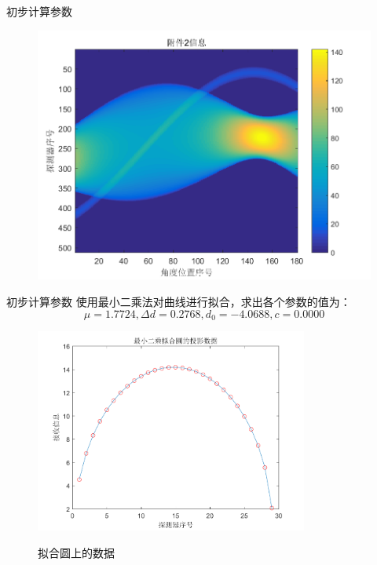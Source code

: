 \documentclass[serif]{beamer} %
\begin{document}
\begin{frame}{初步计算参数}
\begin{figure}[H]
\begin{minipage}[H]{0.45\textwidth}
		\includegraphics[width=\textwidth]{./pic/fujian2.png}
		\end{minipage}
	\end{figure}

\end{frame}

\begin{frame}{初步计算参数}
	\small 使用最小二乘法对曲线进行拟合，求出各个参数的值为：
	\[\mu =1.7724 , \Delta d = 0.2768, d_0 = -4.0688, c = 0.0000\]
	\begin{figure}[H]
		\centering
		\includegraphics[width=0.8\textwidth]{./pic/fitCir.png}\\
		\caption{拟合圆上的数据}
	  \end{figure}

\end{frame}
\end{document}

